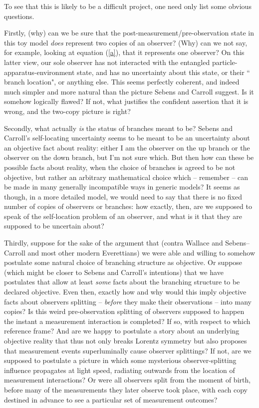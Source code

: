 \documentclass[aps,prl,12pt]{revtex4}
\begin{document}
To see that this is likely to be a difficult project, one
need only list some obvious questions.   

Firstly, 
(why) can we be sure that the post-measurement/pre-observation state in this toy
model {\it does} represent two copies of an observer? 
(Why) can we not say, for example, looking at equation (\ref{a}), that 
it represents one observer?   On this latter
view, our sole observer has not interacted with the entangled 
particle-apparatus-environment state, and
has no uncertainty about this state, or their
`` branch location", or anything else.   This seems perfectly coherent,
and indeed much simpler and more natural than the picture 
Sebens and Carroll suggest.   Is it somehow logically flawed?
If not, what justifies the confident assertion that it is wrong, and
the two-copy picture is right?   

Secondly, what actually {\it is} the status of branches meant to be?   
Sebens and Carroll's self-locating uncertainty
seems to be meant to be an uncertainty about an objective
fact about reality: either I am the observer on the up
branch or the observer on the down branch, but I'm not sure which.   
But then how can these be possible facts about reality, when
the choice of branches is agreed to be not objective,
but rather an arbitrary mathematical choice which -- remember --
can be made in many generally incompatible
ways in generic models?   It seems as though, in a more detailed
model, we would need to say that there is no fixed number of 
copies of observers or branches: how exactly, then, 
are we supposed to speak of the
self-location problem of an observer, and what is it that they
are supposed to be uncertain about?  

Thirdly, suppose for the sake of the argument
that (contra Wallace \cite{wallaceontology,wallace2012emergent} and 
Sebens--Carroll \cite{cs1,cs2} and most other modern Everettians) we  
were able and willing to somehow postulate 
some natural choice of branching structure as objective.
Or suppose (which might be closer to Sebens and Carroll's intentions)
that we have postulates that allow
at least {\it some} facts about the branching structure to be 
declared objective.    
Even then, exactly how
and why would this imply objective facts about observers
splitting -- {\it before} they make their observations -- into
many copies?   Is this weird pre-observation splitting
of observers supposed to happen the instant
a measurement interaction is completed?  If so, with 
respect to which reference frame?  And are we happy to 
postulate a story about an underlying objective reality
that thus not only breaks Lorentz symmetry but also
proposes that measurement events superluminally cause
observer splittings?  If not, are we
supposed to postulate a picture in which some mysterious
observer-splitting influence propagates at light speed,
radiating outwards from the location of measurement
interactions?  Or were all observers split from the
moment of birth, before many of the measurements they
later observe took place, with each copy destined in
advance to see a particular set of measurement outcomes? 
\end{document}

